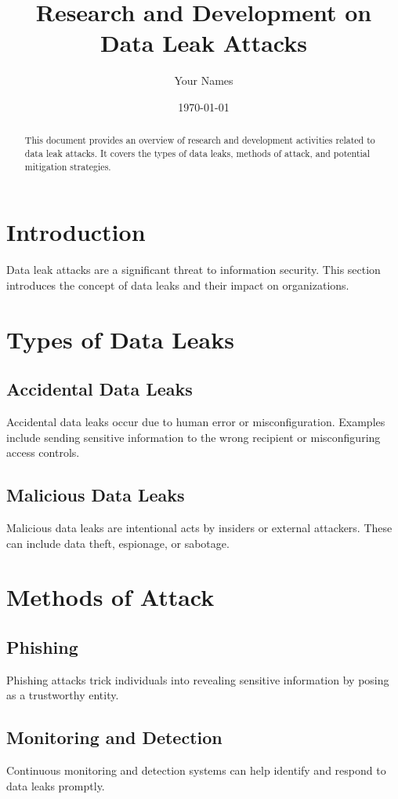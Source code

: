 \documentclass{article}
\title{Research and Development on Data Leak Attacks}
\author{Your Names}
\date{\today}
\begin{document}
\maketitle

\begin{abstract}
This document provides an overview of research and development activities related to data leak attacks. It covers the types of data leaks, methods of attack, and potential mitigation strategies.
\end{abstract}

\section{Introduction}
Data leak attacks are a significant threat to information security. This section introduces the concept of data leaks and their impact on organizations.

\section{Types of Data Leaks}
\subsection{Accidental Data Leaks}
Accidental data leaks occur due to human error or misconfiguration. Examples include sending sensitive information to the wrong recipient or misconfiguring access controls.

\subsection{Malicious Data Leaks}
Malicious data leaks are intentional acts by insiders or external attackers. These can include data theft, espionage, or sabotage.

\section{Methods of Attack}
\subsection{Phishing}
Phishing attacks trick individuals into revealing sensitive information by posing as a trustworthy entity.

\subsection{Monitoring and Detection}
Continuous monitoring and detection systems can help identify and respond to data leaks promptly.
\end{document}
